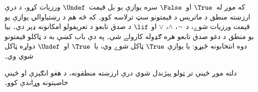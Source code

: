 \documentclass[../../../include/open-logic-section]{subfiles}
\begin{document}


که موږ له~$\True$ او~$\False$ سره يوازې يو بل قيمت~$\Undef$
ورزيات کړو، د درې ارزښته منطق د ماتريس د قيمتونو سټ ترلاسه کوو۔ که څه هم د رښتياوالي
يوازې يو قيمت ورزيات شوے، د~$\lnot$، $\land$، $\lor$ او
$\lif$ د صدق تابعو د تعريفولو امکانونه ډېر دي۔ بيا يو منطق د دغو
صدق تابعو هره ګډوله کارولے شي۔ په دې باب کښې به د ټاکلو قيمتونو دوه انتخابونه څېړو: يا يوازې
$\True$ ټاکل شوے وي، يا~$\True$ او~$\Undef$ دواړه ټاکل شوي وي۔

دلته موږ ځينې تر ټولو پېژندل شوي درې ارزښته منطقونه، د هغو
انګېزې او ځينې خاصيتونه وړاندې کوو۔
\end{document}
